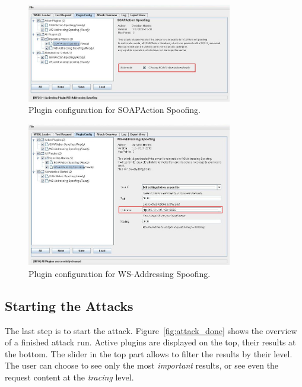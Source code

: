 \begin{figure}[h!]
    \begin{center}
        \includegraphics[width=0.8\textwidth]{img/plugin_config_sas}
    \end{center}
    \caption{Plugin configuration for SOAPAction Spoofing.}
    \label{fig:plugin_config_sas}
\end{figure}

\begin{figure}[h!]
    \begin{center}
        \includegraphics[width=0.8\textwidth]{img/plugin_config_wsas}
    \end{center}
    \caption{Plugin configuration for WS-Addressing Spoofing.}
    \label{fig:plugin_config_wsas}
\end{figure}

\subsection{Starting the Attacks}
\label{sec:starting_the_attacks}

The last step is to start the attack. Figure~\ref{fig:attack_done} shows
the overview of a finished attack run. Active plugins are displayed on the top,
their results at the bottom. The slider in the top part allows to filter the
results by their level. The user can choose to see only the most
\emph{important} results, or see even the request content at the \emph{tracing}
level.

